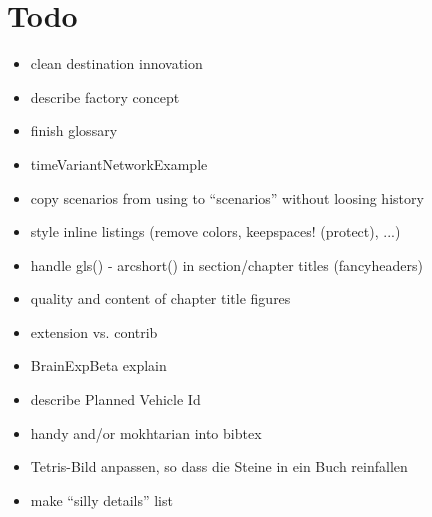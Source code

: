 \section*{Todo}

\begin{itemize}\styleItemize

\item clean destination innovation

\item describe factory concept

\item finish glossary

\item timeVariantNetworkExample

\item copy scenarios from using to ``scenarios'' without loosing history

\item style inline listings (remove colors, keepspaces! (protect), ...)

\item handle gls() - arcshort() in section/chapter titles (fancyheaders)

\item quality and content of chapter title figures

\item extension vs. contrib

\item BrainExpBeta explain

\item describe Planned Vehicle Id

\item handy and/or mokhtarian into bibtex

\item Tetris-Bild anpassen, so dass die Steine in ein Buch reinfallen

\item make ``silly details'' list







\end{itemize}